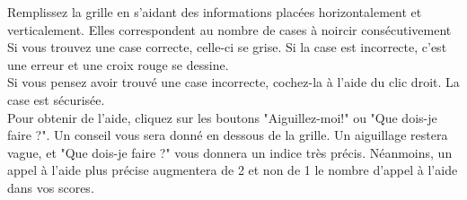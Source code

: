       Remplissez la grille en s’aidant des informations placées horizontalement et verticalement. Elles correspondent au nombre de cases à noircir consécutivement\\
      
    Si vous trouvez une case correcte, celle-ci se grise. Si la case est incorrecte, c’est une erreur et une croix rouge se dessine.\\
      
      Si vous pensez avoir trouvé une case incorrecte, cochez-la à l’aide du clic droit. La case est sécurisée.\\
      
      Pour obtenir de l’aide, cliquez sur les boutons "Aiguillez-moi!" ou "Que dois-je faire ?". 
      Un conseil vous sera donné en dessous de la grille. Un aiguillage restera vague, et "Que dois-je faire ?" vous donnera un indice très précis. 
      Néanmoins, un appel à l'aide plus précise augmentera de 2 et non de 1 le nombre d'appel à l'aide dans vos scores.\\





